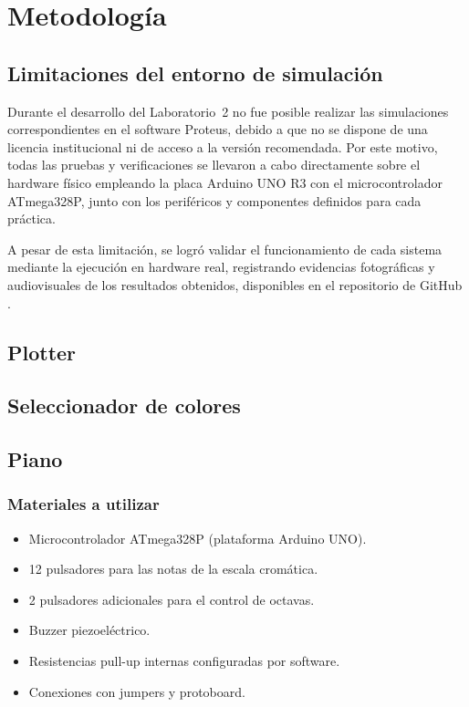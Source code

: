 \vspace{0.8cm}

\section{Metodología}

\subsection{Limitaciones del entorno de simulación}

Durante el desarrollo del Laboratorio~2 no fue posible realizar las simulaciones correspondientes en el software Proteus, debido a que no se dispone de una licencia institucional ni de acceso a la versión recomendada. Por este motivo, todas las pruebas y verificaciones se llevaron a cabo directamente sobre el hardware físico empleando la placa Arduino UNO R3 con el microcontrolador ATmega328P, junto con los periféricos y componentes definidos para cada práctica.

A pesar de esta limitación, se logró validar el funcionamiento de cada sistema mediante la ejecución en hardware real, registrando evidencias fotográficas y audiovisuales de los resultados obtenidos, disponibles en el repositorio de GitHub \cite{github_evidencias_lab2}.

\subsection{Plotter}

\subsection{Seleccionador de colores}

\subsection{Piano}

\subsubsection{Materiales a utilizar}
\begin{itemize}
    \item Microcontrolador ATmega328P (plataforma Arduino UNO).
    \item 12 pulsadores para las notas de la escala cromática.
    \item 2 pulsadores adicionales para el control de octavas.
    \item Buzzer piezoeléctrico.
    \item Resistencias pull-up internas configuradas por software.
    \item Conexiones con jumpers y protoboard.
\end{itemize}

